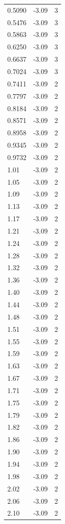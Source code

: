 \begin{longtable}{lrr}
  0.5090 & -3.09 & 3 \\
  0.5476 & -3.09 & 3 \\
  0.5863 & -3.09 & 3 \\
  0.6250 & -3.09 & 3 \\
  0.6637 & -3.09 & 3 \\
  0.7024 & -3.09 & 3 \\
  0.7411 & -3.09 & 2 \\
  0.7797 & -3.09 & 2 \\
  0.8184 & -3.09 & 2 \\
  0.8571 & -3.09 & 2 \\
  0.8958 & -3.09 & 2 \\
  0.9345 & -3.09 & 2 \\
  0.9732 & -3.09 & 2 \\
  1.01 & -3.09 & 2 \\
  1.05 & -3.09 & 2 \\
  1.09 & -3.09 & 2 \\
  1.13 & -3.09 & 2 \\
  1.17 & -3.09 & 2 \\
  1.21 & -3.09 & 2 \\
  1.24 & -3.09 & 2 \\
  1.28 & -3.09 & 2 \\
  1.32 & -3.09 & 2 \\
  1.36 & -3.09 & 2 \\
  1.40 & -3.09 & 2 \\
  1.44 & -3.09 & 2 \\
  1.48 & -3.09 & 2 \\
  1.51 & -3.09 & 2 \\
  1.55 & -3.09 & 2 \\
  1.59 & -3.09 & 2 \\
  1.63 & -3.09 & 2 \\
  1.67 & -3.09 & 2 \\
  1.71 & -3.09 & 2 \\
  1.75 & -3.09 & 2 \\
  1.79 & -3.09 & 2 \\
  1.82 & -3.09 & 2 \\
  1.86 & -3.09 & 2 \\
  1.90 & -3.09 & 2 \\
  1.94 & -3.09 & 2 \\
  1.98 & -3.09 & 2 \\
  2.02 & -3.09 & 2 \\
  2.06 & -3.09 & 2 \\
  2.10 & -3.09 & 2 \\

\end{longtable}
